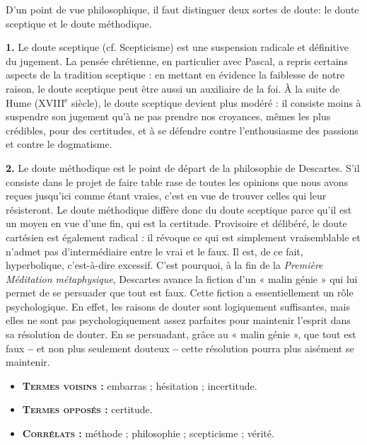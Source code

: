 D'un point de vue philosophique, il faut
distinguer deux sortes de doute: le
doute sceptique et le doute méthodique.

{\bf 1.} Le doute sceptique (cf. Scepticisme)
est une suspension radicale et définitive
du jugement. La pensée chrétienne, en
particulier avec Pascal, a repris certains
aspects de la tradition sceptique : en
mettant en évidence la faiblesse de notre
raison, le doute sceptique peut être aussi
un auxiliaire de la foi. À la suite de
Hume ({\footnotesize XVIII}$^\text{e}$ siècle),
le doute sceptique
devient plus modéré : il consiste moins
à suspendre son jugement qu’à ne pas
prendre nos croyances, mêmes les plus
crédibles, pour des certitudes, et à se
défendre contre l'enthousiasme des passions
et contre le dogmatisme.

{\bf 2.} Le doute méthodique est le point de
départ de la philosophie de Descartes.
S'il consiste dans le projet de faire table
rase de toutes les opinions que nous
avons reçues jusqu'ici comme étant
vraies, c'est en vue de trouver celles qui
leur résisteront. Le doute méthodique
diffère donc du doute sceptique parce
qu'il est un moyen en vue d’une fin, qui
est la certitude. Provisoire et délibéré, le
doute cartésien est également radical : il
révoque ce qui est simplement vraisemblable
et n’admet pas d'intermédiaire
entre le vrai et le faux. Il est, de ce fait,
hyperbolique, c'est-à-dire excessif. C’est
pourquoi, à la fin de la {\it Première Méditation
métaphysique}, Descartes avance
la fiction d'un « malin génie » qui lui
permet de se persuader que tout est
faux. Cette fiction a essentiellement un
rôle psychologique. En effet, les raisons
de douter sont logiquement suffisantes,
mais elles ne sont pas psychologiquement
assez parfaites pour maintenir
l'esprit dans sa résolution de douter. En
se persuadant, grâce au « malin génie »,
que tout est faux {\bf --} et non plus seulement
douteux {\bf --} cette résolution pourra
plus aisément se maintenir.

{\footnotesize
\begin{itemize}[leftmargin=1cm, label=, itemsep=1pt]
\item {\bf \textsc{Termes voisins} :} embarras ; hésitation ;
incertitude.
\item {\bf \textsc{Termes opposés} :} certitude.
\item {\bf \textsc{Corrélats} :} méthode ; philosophie ;
scepticisme ; vérité.
\end{itemize}
}


